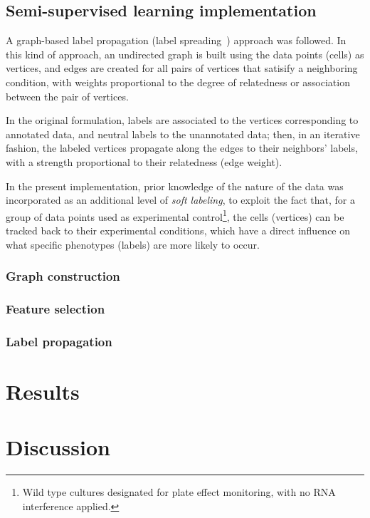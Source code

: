 \documentclass[oneside, a4paper, draft]{memoir} %
\begin{document}
\subsection{Semi-supervised learning implementation}
A graph-based label propagation (label spreading~\cite{zhou2004learning}) approach was followed. In this kind of
approach, an undirected graph is built using the data points (cells) as vertices, and edges are created for all pairs
of vertices that satisify a neighboring condition, with weights proportional to the degree of relatedness or
association between the pair of vertices.

In the original formulation, labels are associated to the vertices corresponding to annotated data, and neutral labels
to the unannotated data; then, in an iterative fashion, the labeled vertices propagate along the edges to their
neighbors' labels, with a strength proportional to their relatedness (edge weight).

In the present implementation, prior knowledge of the nature of the data was incorporated as an additional level of
\emph{soft labeling}, to exploit the fact that, for a group of data points used as experimental control\footnote{Wild
type cultures designated for plate effect monitoring, with no RNA interference applied.}, the cells (vertices) can be
tracked back to their experimental conditions, which have a direct influence on what specific phenotypes (labels)
are more likely to occur.

\subsubsection{Graph construction}
\textcolor{gray}{\lipsum[32]}

\subsubsection{Feature selection}
\textcolor{gray}{\lipsum[88]}

\subsubsection{Label propagation}
\textcolor{gray}{\lipsum[44]}

\section{Results}
\textcolor{gray}{\lipsum[8]}

\section{Discussion}
\textcolor{gray}{\lipsum[9]}
\end{document}
